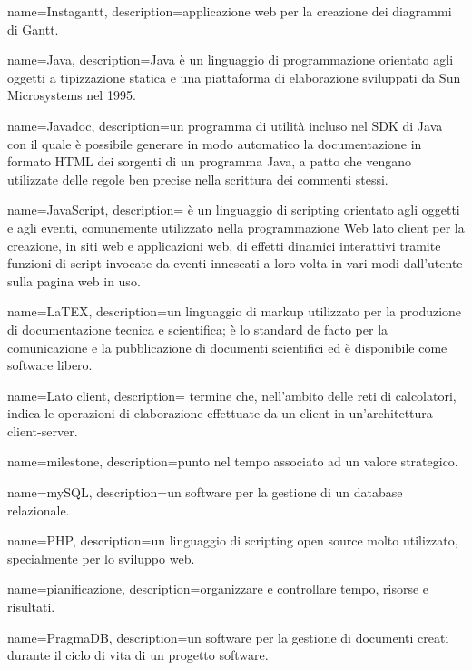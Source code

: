 {
name={Instagantt},
description={applicazione web per la creazione dei diagrammi di Gantt.}
}

{
name={Java},
description={Java è un linguaggio di programmazione orientato agli oggetti a tipizzazione statica e una piattaforma di elaborazione sviluppati da Sun Microsystems nel 1995.}
}

{
name={Javadoc},
description={un programma di utilità incluso nel SDK di Java con il quale è possibile generare in modo automatico la documentazione in formato HTML dei sorgenti di un programma Java, a patto che vengano utilizzate delle regole ben precise nella scrittura dei commenti stessi.}
}

{
name={JavaScript},
description={ è un linguaggio di scripting orientato agli oggetti e agli eventi, comunemente utilizzato nella programmazione Web lato client per la creazione, in siti web e applicazioni web, di eﬀetti dinamici interattivi tramite funzioni di script invocate da eventi innescati a loro volta in vari modi dall’utente sulla pagina web in uso. }
}

{
name={LaTEX},
description={un linguaggio di markup utilizzato per la produzione di documentazione tecnica e scientiﬁca; è lo standard de facto per la comunicazione e la pubblicazione di documenti scientiﬁci ed è disponibile come software libero.}
}

{
name={Lato client},
description={ termine che, nell’ambito delle reti di calcolatori, indica le operazioni di elaborazione eﬀettuate da un client in un’architettura client-server. }
}

{
name={milestone},
description={punto nel tempo associato ad un valore strategico.}
}

{
name={mySQL},
description={un software per la gestione di un database relazionale.}
}

{
name={PHP},
description={un linguaggio di scripting open source molto utilizzato, specialmente per lo sviluppo web.}
}

{
name={pianificazione},
description={organizzare e controllare tempo, risorse e risultati.}
}

{
name={PragmaDB},
description={un software per la gestione di documenti creati durante il ciclo di vita di un progetto software.}
}

